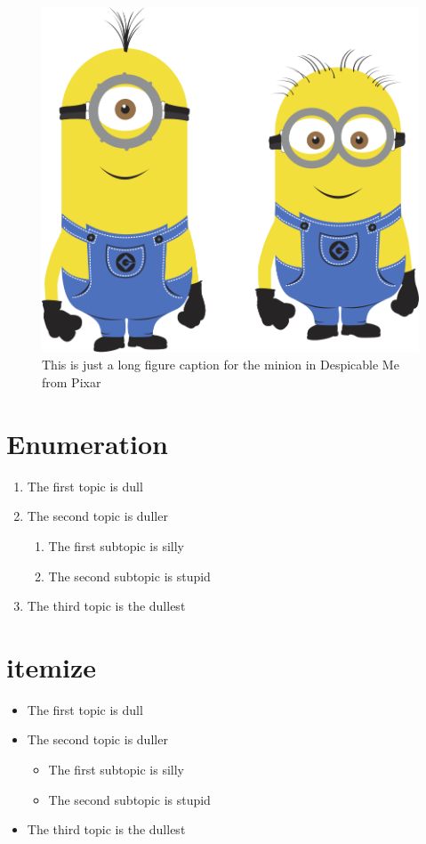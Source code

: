 \begin{figure}[htbp!] 
	\centering    
	\includegraphics[width=1.0\textwidth]{minion}
	\caption[Minion]{This is just a long figure caption for the minion in Despicable Me from Pixar}
	\label{fig:minion}
\end{figure}


\section*{Enumeration}
\begin{enumerate}
	\item The first topic is dull
	\item The second topic is duller
	\begin{enumerate}
		\item The first subtopic is silly
		\item The second subtopic is stupid
	\end{enumerate}
	\item The third topic is the dullest
\end{enumerate}

\section*{itemize}
\begin{itemize}
	\item The first topic is dull
	\item The second topic is duller
	\begin{itemize}
		\item The first subtopic is silly
		\item The second subtopic is stupid
	\end{itemize}
	\item The third topic is the dullest
\end{itemize}

